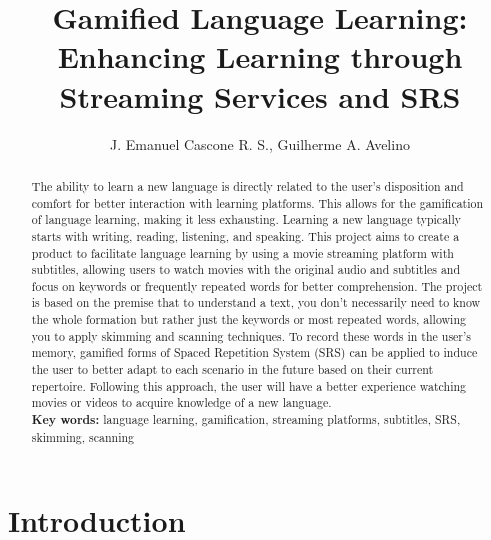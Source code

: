 \documentclass[12pt]{article}
\title{Gamified Language Learning: Enhancing Learning through Streaming Services and SRS}
\author{J. Emanuel Cascone R. S.\inst{1}, Guilherme A. Avelino\inst{1} }
\begin{document}
 

\maketitle

\begin{abstract} 
  The ability to learn a new language is directly related to the user's disposition and comfort for better interaction with learning platforms. This allows for the gamification of language learning, making it less exhausting. Learning a new language typically starts with writing, reading, listening, and speaking. This project aims to create a product to facilitate language learning by using a movie streaming platform with subtitles, allowing users to watch movies with the original audio and subtitles and focus on keywords or frequently repeated words for better comprehension. The project is based on the premise that to understand a text, you don't necessarily need to know the whole formation but rather just the keywords or most repeated words, allowing you to apply skimming and scanning techniques. To record these words in the user's memory, gamified forms of Spaced Repetition System (SRS) can be applied to induce the user to better adapt to each scenario in the future based on their current repertoire. Following this approach, the user will have a better experience watching movies or videos to acquire knowledge of a new language. \\
  \textbf{Key words:} language learning, gamification, streaming platforms, subtitles, SRS, skimming, scanning
\end{abstract} 



\section{Introduction} 
\end{document}
